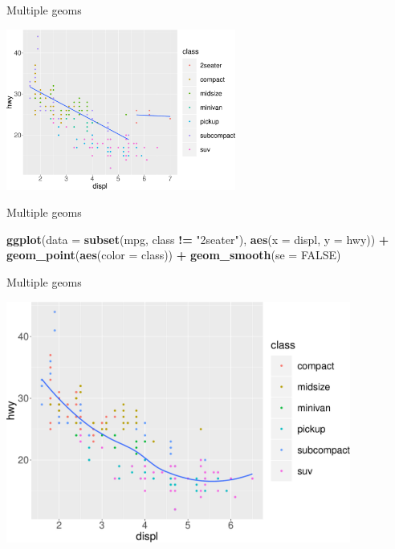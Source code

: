 \documentclass[ignorenonframetext,]{beamer}
\newenvironment{Shaded}{\begin{snugshade}}{\end{snugshade}}
\newcommand{\DataTypeTok}[1]{\textcolor[rgb]{0.13,0.29,0.53}{#1}}
\newcommand{\KeywordTok}[1]{\textcolor[rgb]{0.13,0.29,0.53}{\textbf{#1}}}
\newcommand{\NormalTok}[1]{#1}
\newcommand{\OperatorTok}[1]{\textcolor[rgb]{0.81,0.36,0.00}{\textbf{#1}}}
\newcommand{\OtherTok}[1]{\textcolor[rgb]{0.56,0.35,0.01}{#1}}
\newcommand{\StringTok}[1]{\textcolor[rgb]{0.31,0.60,0.02}{#1}}
\begin{document}
\begin{frame}{Multiple geoms}
\protect\hypertarget{multiple-geoms-30}{}

\begin{center}\includegraphics[height=200px]{data-visualization_files/figure-beamer/unnamed-chunk-107-1} \end{center}

\end{frame}

\begin{frame}[fragile]{Multiple geoms}
\protect\hypertarget{multiple-geoms-31}{}

\begin{Shaded}
\begin{Highlighting}[]
\KeywordTok{ggplot}\NormalTok{(}\DataTypeTok{data =} \KeywordTok{subset}\NormalTok{(mpg, class }\OperatorTok{!=}\StringTok{ "2seater"}\NormalTok{), }
       \KeywordTok{aes}\NormalTok{(}\DataTypeTok{x =}\NormalTok{ displ, }\DataTypeTok{y =}\NormalTok{ hwy)) }\OperatorTok{+}
\StringTok{  }\KeywordTok{geom_point}\NormalTok{(}\KeywordTok{aes}\NormalTok{(}\DataTypeTok{color =}\NormalTok{ class)) }\OperatorTok{+}
\StringTok{  }\KeywordTok{geom_smooth}\NormalTok{(}\DataTypeTok{se =} \OtherTok{FALSE}\NormalTok{)}
\end{Highlighting}
\end{Shaded}

\end{frame}

\begin{frame}{Multiple geoms}
\protect\hypertarget{multiple-geoms-32}{}

\begin{center}\includegraphics[height=300px]{data-visualization_files/figure-beamer/unnamed-chunk-109-1} \end{center}

\end{frame}
\end{document}
